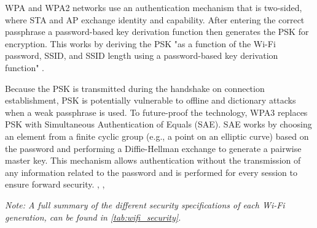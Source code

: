 WPA and WPA2 networks use an authentication mechanism that is two-sided, where STA and AP exchange identity and capability.
After entering the correct passphrase a password-based key derivation function then generates the PSK for encryption. 
This works by deriving the PSK "as a function of the Wi-Fi password, SSID, and SSID length using a password-based key derivation function" \cite[page~106]{Sankaran_Gulasekaran_2021}.

Because the PSK is transmitted during the handshake on connection establishment, PSK is potentially vulnerable to offline and dictionary attacks when a weak passphrase is used.
To future-proof the technology, WPA3 replaces PSK with Simultaneous Authentication of Equals (SAE).
SAE works by choosing an element from a finite cyclic group (e.g., a point on an elliptic curve) based on the password and performing a Diffie-Hellman exchange to generate a pairwise master key.
This mechanism allows authentication without the transmission of any information related to the password and is performed for every session to ensure forward security.
\cite{Oriyano_2017}, \cite[page~115-116]{Sankaran_Gulasekaran_2021}, \cite{SAE}

\textit{Note: A full summary of the different security specifications of each Wi-Fi generation, can be found in \cref{tab:wifi_security}.}
